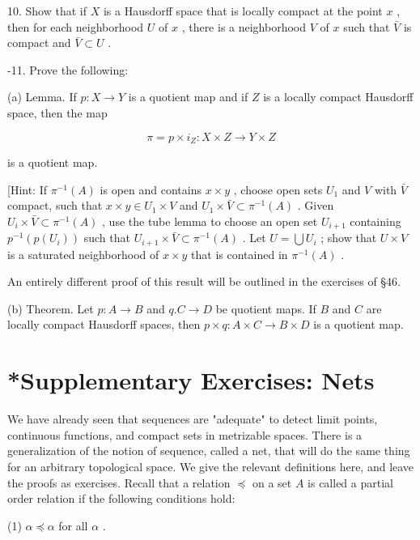 10. Show that if \(X\) is a Hausdorff space that is locally compact at the point \(x\) , then for each neighborhood \(U\) of \(x\) , there is a neighborhood \(V\) of \(x\) such that \(\bar{V}\) is compact and \(\bar{V} \subset  U\) .

-11. Prove the following:

(a) Lemma. If \(p : X \rightarrow  Y\) is a quotient map and if \(Z\) is a locally compact Hausdorff space, then the map

\[
\pi  = p \times  {i}_{Z} : X \times  Z \rightarrow  Y \times  Z
\]

is a quotient map.

[Hint: If \({\pi }^{-1}\left( A\right)\) is open and contains \(x \times  y\) , choose open sets \({U}_{1}\) and \(V\) with \(\bar{V}\) compact, such that \(x \times  y \in  {U}_{1} \times  V\) and \({U}_{1} \times  \bar{V} \subset  {\pi }^{-1}\left( A\right)\) . Given \({U}_{i} \times  \bar{V} \subset  {\pi }^{-1}\left( A\right)\) , use the tube lemma to choose an open set \({U}_{i + 1}\) containing \({p}^{-1}\left( {p\left( {U}_{i}\right) }\right)\) such that \({U}_{i + 1} \times  \bar{V} \subset  {\pi }^{-1}\left( A\right)\) . Let \(U = \bigcup {U}_{i}\) ; show that \(U \times  V\) is a saturated neighborhood of \(x \times  y\) that is contained in \({\pi }^{-1}\left( A\right)\) .

An entirely different proof of this result will be outlined in the exercises of §46.

(b) Theorem. Let \(p : A \rightarrow  B\) and \(q.C \rightarrow  D\) be quotient maps. If \(B\) and \(C\) are locally compact Hausdorff spaces, then \(p \times  q : A \times  C \rightarrow  B \times  D\) is a quotient map.

\section*{*Supplementary Exercises: Nets}

We have already seen that sequences are "adequate" to detect limit points, continuous functions, and compact sets in metrizable spaces. There is a generalization of the notion of sequence, called a net, that will do the same thing for an arbitrary topological space. We give the relevant definitions here, and leave the proofs as exercises. Recall that a relation \(\preccurlyeq\) on a set \(A\) is called a partial order relation if the following conditions hold:

(1) \(\alpha  \preccurlyeq  \alpha\) for all \(\alpha\) .

